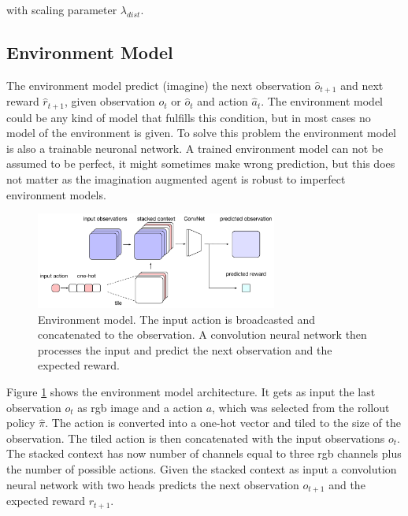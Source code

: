 with scaling parameter $\lambda_{dist}$.\\


\subsection{Environment Model}
\label{sec:env_model}

The environment model predict (imagine) the next observation $\hat{o}_{t+1}$ and next reward $\hat{r}_{t+1}$, given observation $o_t$ or $\hat{o}_t$ and action $\hat{a}_t$.
The environment model could be any kind of model that fulfills this condition, but in most cases no model of the environment is given.
To solve this problem the environment model is also a trainable neuronal network.
A trained environment model can not be assumed to be perfect, it might sometimes make wrong prediction, but this does not matter as the imagination augmented agent is robust to imperfect environment models.

   
\begin{figure}[H] 
  \centering 
   
  \includegraphics[width=300px]{./Images/i2a_env.pdf}
  \caption{Environment model. The input action is broadcasted and concatenated to the observation. A convolution neural network then processes the input and predict the next observation and the expected reward.} 
  \label{fig:environment_model_architecture} 
\end{figure} 

Figure \ref{fig:environment_model_architecture} shows the environment model architecture.
It gets as input the last observation $o_t$ as rgb image and a action $a$, which was selected from the rollout policy $\hat{\pi}$. The action is converted into a one-hot vector and tiled to the size of the observation.
The tiled action is then concatenated with the input observations $o_t$.
The stacked context has now number of channels equal to three rgb channels plus the number of possible actions.
Given the stacked context as input a convolution neural network with two heads predicts the next observation $o_{t+1}$ and the expected reward $r_{t+1}$.\\

